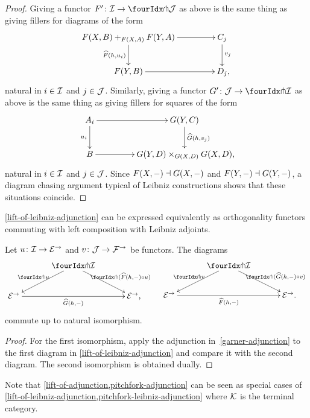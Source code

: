 \documentclass[reqno,10pt,a4paper,oneside,draft]{amsart}
\begin{document}
\begin{proof}
Giving a functor $F' \co \cal{I} \to \liftl{\cal{J}}$ as above is the same thing as giving fillers for diagrams of the form
\[
\xymatrix@C+2em{
  F(X,B) +_{F(X,A)} F(Y,A)
  \ar[d]_{\widehat{F}(h, u_i)}
  \ar[r]
&
  C_j
  \ar[d]^{v_j}
\\
  F(Y, B)
  \ar[r]
&
  D_j
\rlap{,}}
\]
natural in $i \in \cal{I}$ and $j \in \cal{J}$.
Similarly, giving a functor $G' \co \cal{J} \to \liftl{\cal{I}}$ as above is the same thing as giving fillers for squares of the form
\[
\xymatrix@C+2em{
  A_i
  \ar[d]_{u_i}
  \ar[r]
&
  G(Y, C)
  \ar[d]^{\widehat{G}(h, v_j)}
\\
  B
  \ar[r]
&
  G(Y, D) \times_{G(X,D)} G(X, D)
\rlap{,}}
\]
natural in $i \in \cal{I}$ and $j \in \cal{J}$.
Since $F(X, \arghole) \dashv G(X, \arghole)$ and $F(Y, \arghole) \dashv G(Y, \arghole)$, a diagram chasing argument typical of Leibniz constructions shows that these situations coincide.
\end{proof}

\cref{lift-of-leibniz-adjunction} can be expressed equivalently as orthogonality functors commuting with left composition with Leibniz adjoints.

\begin{corollary} \label{pitchfork-leibniz-adjunction}
Let $u \co \cal{I} \to \catE^\to$ and $v \co \cal{J} \to \cal{F}^\to$ be functors.
The diagrams
\begin{align*}
\xymatrix@C+1em{
&
  \liftr{\cal{I}}
  \ar[dr]^-{\liftr{(\widehat{F}(h, -) \cc u)}}
  \ar[dl]_-{\liftr{u}}
&\\
  \catE^\to
  \ar[rr]_-{\widehat{G}(h, -)}
&&
  \catE^\to
\rlap{,}}
&&
\xymatrix@C+1em{
&
  \liftl{\cal{I}}
  \ar[dl]_-{\liftl{v}}
  \ar[dr]^-{\liftl{(\widehat{G}(h, -) \cc v)}}
&\\
  \catE^\to
  \ar[rr]_-{\widehat{F}(h, -)}
&&
  \catE^\to
\rlap{.}}
\end{align*}
commute up to natural isomorphism.
\end{corollary}

\begin{proof}
For the first isomorphism, apply the adjunction in~\eqref{garner-adjunction} to the first diagram in \cref{lift-of-leibniz-adjunction} and compare it with the second diagram.
The second isomorphism is obtained dually.
\end{proof}

Note that \cref{lift-of-adjunction,pitchfork-adjunction} can be seen as special cases of \cref{lift-of-leibniz-adjunction,pitchfork-leibniz-adjunction} where $\cal{K}$ is the terminal category.
\end{document}
